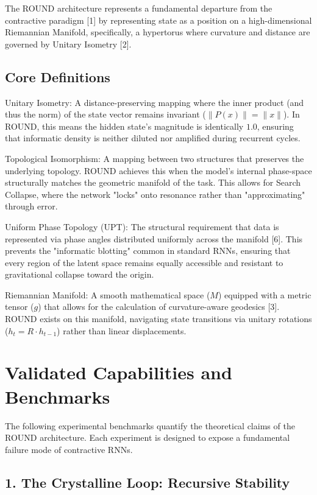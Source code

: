 \documentclass[11pt]{article}
\begin{document}
The ROUND architecture represents a fundamental departure from the contractive paradigm [1] by representing state as a position on a high-dimensional Riemannian Manifold, specifically, a hypertorus where curvature and distance are governed by Unitary Isometry [2].

\subsection{Core Definitions}

Unitary Isometry: A distance-preserving mapping where the inner product (and thus the norm) of the state vector remains invariant ($\|P(x)\| = \|x\|$). In ROUND, this means the hidden state's magnitude is identically $1.0$, ensuring that informatic density is neither diluted nor amplified during recurrent cycles.

Topological Isomorphism: A mapping between two structures that preserves the underlying topology. ROUND achieves this when the model's internal phase-space structurally matches the geometric manifold of the task. This allows for Search Collapse, where the network "locks" onto resonance rather than "approximating" through error.

Uniform Phase Topology (UPT): The structural requirement that data is represented via phase angles distributed uniformly across the manifold [6]. This prevents the "informatic blotting" common in standard RNNs, ensuring that every region of the latent space remains equally accessible and resistant to gravitational collapse toward the origin.

Riemannian Manifold: A smooth mathematical space ($M$) equipped with a metric tensor ($g$) that allows for the calculation of curvature-aware geodesics [3]. ROUND exists on this manifold, navigating state transitions via unitary rotations ($h_{t} = R \cdot h_{t-1}$) rather than linear displacements.

\section{Validated Capabilities and Benchmarks}

The following experimental benchmarks quantify the theoretical claims of the ROUND architecture. Each experiment is designed to expose a fundamental failure mode of contractive RNNs.

\subsection{1. The Crystalline Loop: Recursive Stability}
\end{document}

